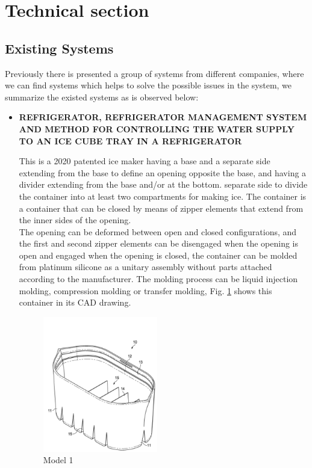 \documentclass[12pt, twoside]{report}
\begin{document}
\section{Technical section}
\subsection{Existing Systems}

Previously there is presented a group of systems from different companies, where we can find systems which helps to solve the possible issues in the system, we summarize the existed systems as is observed below:\\
\begin{itemize}
    \item \textbf{REFRIGERATOR, REFRIGERATOR MANAGEMENT SYSTEM AND METHOD FOR CONTROLLING THE WATER SUPPLY TO AN ICE CUBE TRAY IN A REFRIGERATOR}

This is a 2020 patented ice maker having a base and a separate side extending from the base to define an opening opposite the base, and having a divider extending from the base and/or at the bottom. separate side to divide the container into at least two compartments for making ice. The container is a container that can be closed by means of zipper elements that extend from the inner sides of the opening.\\
The opening can be deformed between open and closed configurations, and the first and second zipper elements can be disengaged when the opening is open and engaged when the opening is closed, the container can be molded from platinum silicone as a unitary assembly without parts attached according to the manufacturer. The molding process can be liquid injection molding, compression molding or transfer molding, Fig. \ref{fig:model1} shows this container in its CAD drawing.

\begin{figure}[H]
    \centering
    \includegraphics[width=50mm,scale=0.8]{images/Project2/innovation1.png}
    \caption{Model 1}
    \label{fig:model1}
\end{figure}


\end{itemize}
\end{document}
